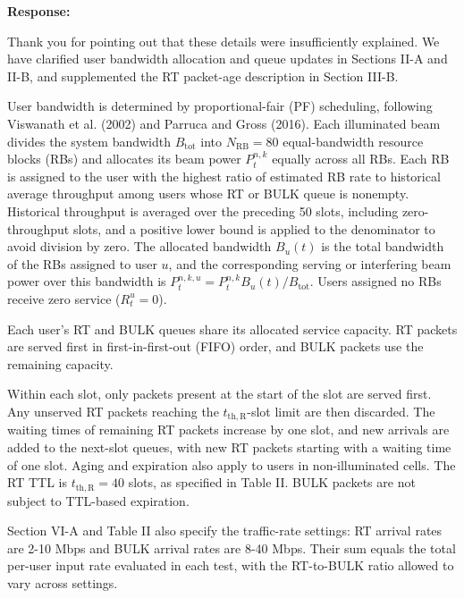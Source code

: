 \documentclass[11pt,a4paper]{article}
\begin{document}
\textbf{Response:}\par

Thank you for pointing out that these details were insufficiently explained. We have clarified user bandwidth allocation and queue updates in Sections II-A and II-B, and supplemented the RT packet-age description in Section III-B.
\par

User bandwidth is determined by proportional-fair (PF) scheduling, following Viswanath et al. (2002) and Parruca and Gross (2016). Each illuminated beam divides the system bandwidth $B_{\mathrm{tot}}$ into $N_{\mathrm{RB}}=80$ equal-bandwidth resource blocks (RBs) and allocates its beam power $P_t^{n,k}$ equally across all RBs. Each RB is assigned to the user with the highest ratio of estimated RB rate to historical average throughput among users whose RT or BULK queue is nonempty. Historical throughput is averaged over the preceding 50 slots, including zero-throughput slots, and a positive lower bound is applied to the denominator to avoid division by zero. The allocated bandwidth $B_u(t)$ is the total bandwidth of the RBs assigned to user $u$, and the corresponding serving or interfering beam power over this bandwidth is $P_t^{n,k,u}=P_t^{n,k}B_u(t)/B_{\mathrm{tot}}$. Users assigned no RBs receive zero service ($R_t^u=0$).
\par

Each user's RT and BULK queues share its allocated service capacity. RT packets are served first in first-in-first-out (FIFO) order, and BULK packets use the remaining capacity.
\par

Within each slot, only packets present at the start of the slot are served first. Any unserved RT packets reaching the $t_{\mathrm{th},\mathrm{R}}$-slot limit are then discarded. The waiting times of remaining RT packets increase by one slot, and new arrivals are added to the next-slot queues, with new RT packets starting with a waiting time of one slot. Aging and expiration also apply to users in non-illuminated cells. The RT TTL is $t_{\mathrm{th},\mathrm{R}}=40$ slots, as specified in Table II. BULK packets are not subject to TTL-based expiration.
\par

Section VI-A and Table II also specify the traffic-rate settings: RT arrival rates are 2-10 Mbps and BULK arrival rates are 8-40 Mbps. Their sum equals the total per-user input rate evaluated in each test, with the RT-to-BULK ratio allowed to vary across settings.
\par
\end{document}

